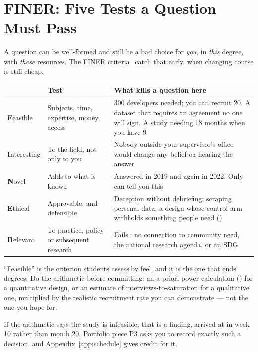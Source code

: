 \section{FINER: Five Tests a Question Must Pass}

A question can be well-formed and still be a bad choice for \emph{you}, in
\emph{this} degree, with \emph{these} resources. The FINER
criteria~\cite{hulley2013designing} catch that early, when changing course is
still cheap.

\begin{center}
\small
\begin{tabular}{@{}L{2.2cm}L{5.0cm}L{6.7cm}@{}}
\toprule
 & \textbf{Test} & \textbf{What kills a question here} \\
\midrule
\textbf{F}easible
  & Subjects, time, expertise, money, access
  & 300 developers needed; you can recruit 20. A dataset that requires an
    agreement no one will sign. A study needing 18 months when you have 9 \\
\textbf{I}nteresting
  & To the field, not only to you
  & Nobody outside your supervisor's office would change any belief on hearing
    the answer \\
\textbf{N}ovel
  & Adds to what is known
  & Answered in 2019 and again in 2022. Only  can tell you this \\
\textbf{E}thical
  & Approvable, and defensible
  & Deception without debriefing; scraping personal data; a design whose
    control arm withholds something people need () \\
\textbf{R}elevant
  & To practice, policy or subsequent research
  & Fails : no connection to community need, the
    national research agenda, or an SDG \\
\bottomrule
\end{tabular}
\end{center}

\begin{pitfall}
``Feasible'' is the criterion students assess by feel, and it is the one that
ends degrees. Do the arithmetic before committing: an a-priori power
calculation () for a quantitative design, or an estimate of
interviews-to-saturation for a qualitative one, multiplied by the realistic
recruitment rate you can demonstrate --- not the one you hope for.

\medskip
If the arithmetic says the study is infeasible, that is a finding, arrived at
in week 10 rather than month 20. Portfolio piece P3 asks you to record exactly
such a decision, and Appendix~\ref{app:schedule} gives credit for it.
\end{pitfall}

